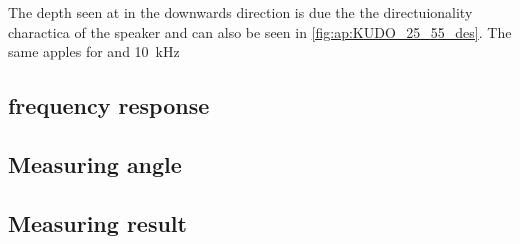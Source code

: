 
The depth seen at  in the downwards direction is due the the directuionality charactica of the speaker and can also be seen in \autoref{fig:ap:KUDO_25_55_des}. The same apples for  and \SI{10}{\kilo\hertz}



\subsection{frequency response}



\subsection{Measuring angle}


\subsection{Measuring result}



